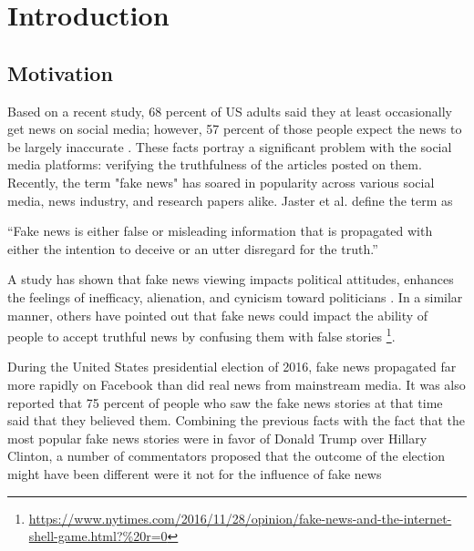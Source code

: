 \chapter{Introduction}\label{introduction}

\section{Motivation}\label{intro:motivation}

Based on a recent study, 68 percent of US adults said they at least occasionally get news on social media; however, 57 percent of those people expect the news to be largely inaccurate \cite{matsa2018news}. These facts portray a significant problem with the social media platforms: verifying the truthfulness of the articles posted on them. Recently, the term "fake news" has soared in popularity across various social media, news industry, and research papers alike. Jaster et al. define the term as \cite{jasterfake}

\enquote{Fake news is either false or misleading information that is propagated with either the intention to deceive or an utter disregard for the truth.}

\noindent
A study has shown that fake news viewing impacts political attitudes, enhances the feelings of inefficacy, alienation, and cynicism toward politicians \cite{balmas2014fake}. In a similar manner, others have pointed out that fake news could impact the ability of people to accept truthful news by confusing them with false stories \footnote{\url{https://www.nytimes.com/2016/11/28/opinion/fake-news-and-the-internet-shell-game.html?\%20r=0}}.

During the United States presidential election of 2016, fake news propagated far more rapidly on Facebook than did real news from mainstream media\cite{silverman2016analysis}. It was also reported that 75 percent of people who saw the fake news stories at that time said that they believed them\cite{silverman2016most}. Combining the previous facts with the fact that the most popular fake news stories were in favor of Donald Trump over Hillary Clinton\cite{silverman2016analysis}, a number of commentators proposed that the outcome of the election might have been different were it not for the influence of fake news \cite{parkinson2016click, read2016donald, dewey2016facebook}

